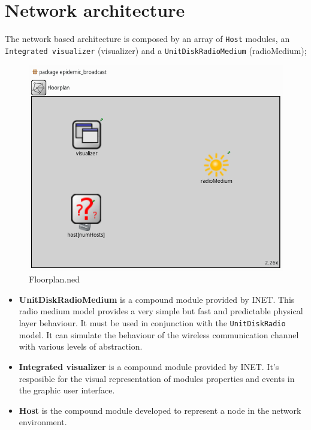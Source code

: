 \section{Network architecture}
The network based architecture is composed by an array of \texttt{Host} modules, an
\texttt{Integrated visualizer} (visualizer) and a \texttt{UnitDiskRadioMedium} (radioMedium);
\begin{figure}[H]
    \begin{center}
        \includegraphics[scale=0.35]{img/floorplan.png}
        \caption{Floorplan.ned}
        \label{fig:floorplanOmnet}
    \end{center}
    \vspace*{-0.8cm}
\end{figure}
\begin{itemize}
    \item \textbf{UnitDiskRadioMedium} is a compound module provided by INET.
    This radio medium model provides a very simple but fast and predictable
    physical layer behaviour. It must be used in conjunction with the
    \texttt{UnitDiskRadio} model. It can simulate the behaviour of the wireless
    communication channel with various levels of abstraction.
    \item \textbf{Integrated visualizer} is a compound module provided by INET.
    It's resposible for the visual representation of modules properties and
    events in the graphic user interface.
    \item \textbf{Host} is the compound module developed to represent a node
    in the network environment.
\end{itemize}
